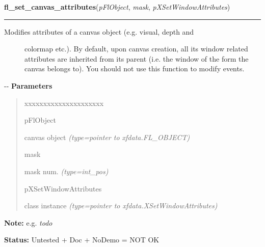 \hspace{.8\funcindent}\begin{boxedminipage}{\funcwidth}

    \raggedright \textbf{fl\_set\_canvas\_attributes}(\textit{pFlObject}, \textit{mask}, \textit{pXSetWindowAttributes})

    \vspace{-1.5ex}

    \rule{\textwidth}{0.5\fboxrule}
\setlength{\parskip}{2ex}
%
\begin{description}
\item[{Modifies attributes of a canvas object (e.g. visual, depth and}] \leavevmode 
colormap etc.). By default, upon canvas creation, all its window related
attributes are inherited from its parent (i.e. the window of the form the
canvas belongs to). You should not use this function to modify events.

\end{description}

-{}-
\setlength{\parskip}{1ex}
      \textbf{Parameters}
      \vspace{-1ex}

      \begin{quote}
        \begin{Ventry}{xxxxxxxxxxxxxxxxxxxxx}

          \item[pFlObject]


canvas object
            {\it (type=pointer to xfdata.FL\_OBJECT)}

          \item[mask]


mask num.
            {\it (type=int\_pos)}

          \item[pXSetWindowAttributes]


class instance
            {\it (type=pointer to xfdata.XSetWindowAttributes)}

        \end{Ventry}

      \end{quote}

\textbf{Note:} 
e.g. \emph{todo}


\textbf{Status:} 
Untested + Doc + NoDemo = NOT OK


    \end{boxedminipage}

    \label{xformslib:flcanvas:fl_add_canvas_handler}

